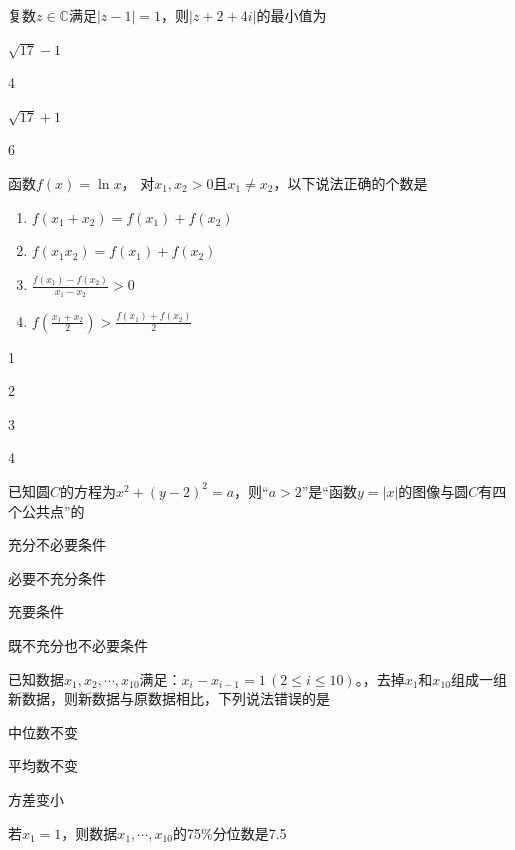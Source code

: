 \documentclass{exam-zh}
\begin{document}
\begin{question}
  复数$z\in\mathbb C$满足$|z-1|=1$，则$|z+2+4i|$的最小值为 \paren

  \begin{choices}
    \item $\sqrt{17}-1$
    \item 4
    \item $\sqrt{17}+1$
    \item 6
  \end{choices}
\end{question}

\begin{question}
  函数$f(x)=\ln x$， 对$x_1,x_2>0$且$x_1\neq x_2$，以下说法正确的个数是 \paren

  \begin{enumerate}
    \item $f(x_1+x_2)=f(x_1)+f(x_2)$
    \item $f(x_1x_2)=f(x_1)+f(x_2)$
    \item $\frac{f(x_1)-f(x_2)}{x_1-x_2}>0$
    \item $f\left(\frac{x_1+x_2}2\right)>\frac{f(x_1)+f(x_2)}2$
  \end{enumerate}

  \begin{choices}
    \item 1
    \item 2
    \item 3
    \item 4
  \end{choices}
\end{question}

\begin{question}
  已知圆$C$的方程为$x^2+(y-2)^2=a$，则“$a>2$”是“函数$y=|x|$的图像与圆$C$有四个公共点”的 \paren

  \begin{choices}
    \item 充分不必要条件
    \item 必要不充分条件
    \item 充要条件
    \item 既不充分也不必要条件
  \end{choices}
\end{question}

\begin{question}
  已知数据$x_1,x_2,\cdots,x_{10}$满足：$x_i-x_{i-1}=1\,(2\le i\le10)$。，去掉$x_1$和$x_{10}$组成一组新数据，则新数据与原数据相比，下列说法错误的是 \paren

  \begin{choices}
    \item 中位数不变
    \item 平均数不变
    \item 方差变小
    \item 若$x_1=1$，则数据$x_1,\cdots,x_{10}$的75\%分位数是7.5
  \end{choices}
\end{question}
\end{document}
